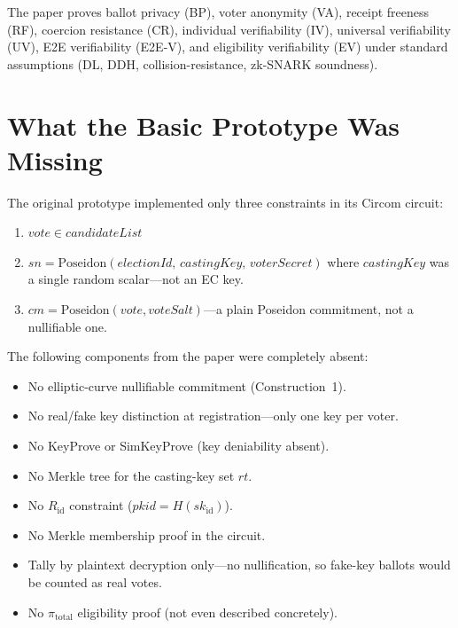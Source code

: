 \documentclass[conference]{IEEEtran}
\begin{document}
The paper proves ballot privacy (BP), voter anonymity (VA), receipt freeness
(RF), coercion resistance (CR), individual verifiability (IV), universal
verifiability (UV), E2E verifiability (E2E-V), and eligibility verifiability
(EV) under standard assumptions (DL, DDH, collision-resistance, zk-SNARK
soundness).

\section{What the Basic Prototype Was Missing}
\label{sec:missing}

The original prototype implemented only three constraints in its Circom circuit:

\begin{enumerate}
  \item $\mathit{vote} \in \mathit{candidateList}$
  \item $\mathit{sn} = \mathrm{Poseidon}(\mathit{electionId},\, \mathit{castingKey},\, \mathit{voterSecret})$
    where $\mathit{castingKey}$ was a single random scalar---not an EC key.
  \item $\mathit{cm} = \mathrm{Poseidon}(\mathit{vote}, \mathit{voteSalt})$---a
    plain Poseidon commitment, not a nullifiable one.
\end{enumerate}

The following components from the paper were completely absent:

\begin{itemize}
  \item No elliptic-curve nullifiable commitment (Construction~1).
  \item No real/fake key distinction at registration---only one key per voter.
  \item No \textsf{KeyProve} or \textsf{SimKeyProve} (key deniability absent).
  \item No Merkle tree for the casting-key set $\mathit{rt}$.
  \item No $R_{\text{id}}$ constraint ($\mathit{pkid} = H(\mathit{sk}_{\mathrm{id}})$).
  \item No Merkle membership proof in the circuit.
  \item Tally by plaintext decryption only---no nullification, so fake-key
    ballots would be counted as real votes.
  \item No $\pi_{\text{total}}$ eligibility proof (not even described concretely).
\end{itemize}
\end{document}
